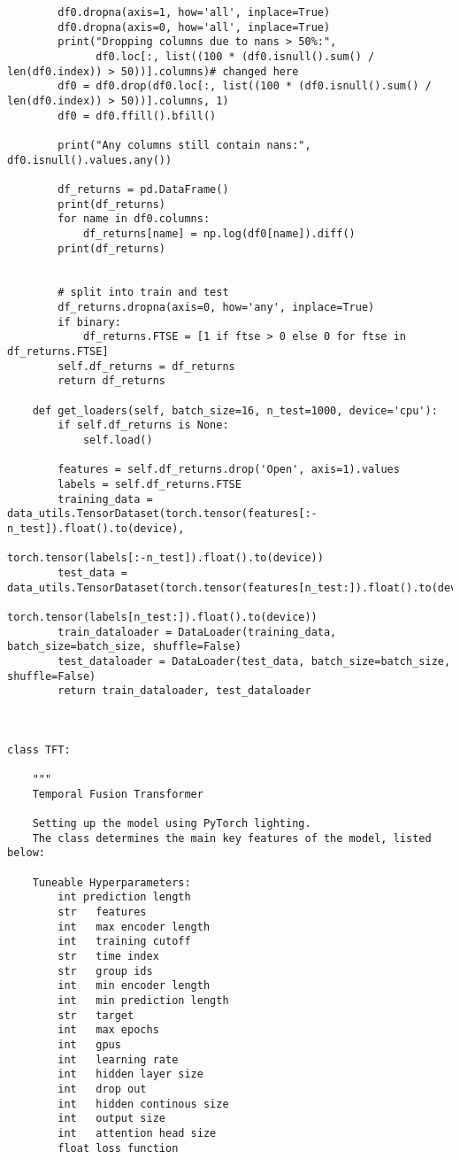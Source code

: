 \documentclass{article}
\begin{document}
\begin{lstlisting}
        df0.dropna(axis=1, how='all', inplace=True)
        df0.dropna(axis=0, how='all', inplace=True)
        print("Dropping columns due to nans > 50%:",
              df0.loc[:, list((100 * (df0.isnull().sum() / len(df0.index)) > 50))].columns)# changed here
        df0 = df0.drop(df0.loc[:, list((100 * (df0.isnull().sum() / len(df0.index)) > 50))].columns, 1)
        df0 = df0.ffill().bfill()

        print("Any columns still contain nans:", df0.isnull().values.any())

        df_returns = pd.DataFrame()
        print(df_returns)
        for name in df0.columns:
            df_returns[name] = np.log(df0[name]).diff()
        print(df_returns)


        # split into train and test
        df_returns.dropna(axis=0, how='any', inplace=True)
        if binary:
            df_returns.FTSE = [1 if ftse > 0 else 0 for ftse in df_returns.FTSE]
        self.df_returns = df_returns
        return df_returns

    def get_loaders(self, batch_size=16, n_test=1000, device='cpu'):
        if self.df_returns is None:
            self.load()

        features = self.df_returns.drop('Open', axis=1).values
        labels = self.df_returns.FTSE
        training_data = data_utils.TensorDataset(torch.tensor(features[:-n_test]).float().to(device),
                                                 torch.tensor(labels[:-n_test]).float().to(device))
        test_data = data_utils.TensorDataset(torch.tensor(features[n_test:]).float().to(device),
                                             torch.tensor(labels[n_test:]).float().to(device))
        train_dataloader = DataLoader(training_data, batch_size=batch_size, shuffle=False)
        test_dataloader = DataLoader(test_data, batch_size=batch_size, shuffle=False)
        return train_dataloader, test_dataloader



class TFT:

    """
    Temporal Fusion Transformer

    Setting up the model using PyTorch lighting.
    The class determines the main key features of the model, listed below:

    Tuneable Hyperparameters:
        int prediction length
        str   features
        int   max encoder length
        int   training cutoff
        str   time index
        str   group ids
        int   min encoder length
        int   min prediction length
        str   target
        int   max epochs
        int   gpus
        int   learning rate
        int   hidden layer size
        int   drop out
        int   hidden continous size
        int   output size
        int   attention head size
        float loss function


\end{lstlisting}
\end{document}
